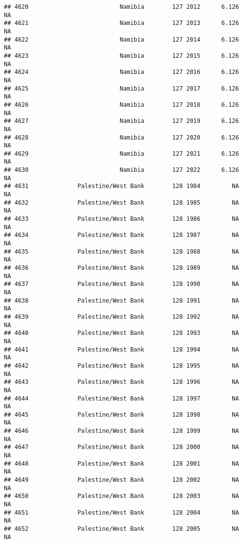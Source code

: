 \documentclass[
]{article}
\begin{document}
\begin{verbatim}
## 4620                          Namibia        127 2012      6.126         NA
## 4621                          Namibia        127 2013      6.126         NA
## 4622                          Namibia        127 2014      6.126         NA
## 4623                          Namibia        127 2015      6.126         NA
## 4624                          Namibia        127 2016      6.126         NA
## 4625                          Namibia        127 2017      6.126         NA
## 4626                          Namibia        127 2018      6.126         NA
## 4627                          Namibia        127 2019      6.126         NA
## 4628                          Namibia        127 2020      6.126         NA
## 4629                          Namibia        127 2021      6.126         NA
## 4630                          Namibia        127 2022      6.126         NA
## 4631              Palestine/West Bank        128 1984         NA         NA
## 4632              Palestine/West Bank        128 1985         NA         NA
## 4633              Palestine/West Bank        128 1986         NA         NA
## 4634              Palestine/West Bank        128 1987         NA         NA
## 4635              Palestine/West Bank        128 1988         NA         NA
## 4636              Palestine/West Bank        128 1989         NA         NA
## 4637              Palestine/West Bank        128 1990         NA         NA
## 4638              Palestine/West Bank        128 1991         NA         NA
## 4639              Palestine/West Bank        128 1992         NA         NA
## 4640              Palestine/West Bank        128 1993         NA         NA
## 4641              Palestine/West Bank        128 1994         NA         NA
## 4642              Palestine/West Bank        128 1995         NA         NA
## 4643              Palestine/West Bank        128 1996         NA         NA
## 4644              Palestine/West Bank        128 1997         NA         NA
## 4645              Palestine/West Bank        128 1998         NA         NA
## 4646              Palestine/West Bank        128 1999         NA         NA
## 4647              Palestine/West Bank        128 2000         NA         NA
## 4648              Palestine/West Bank        128 2001         NA         NA
## 4649              Palestine/West Bank        128 2002         NA         NA
## 4650              Palestine/West Bank        128 2003         NA         NA
## 4651              Palestine/West Bank        128 2004         NA         NA
## 4652              Palestine/West Bank        128 2005         NA         NA

\end{verbatim}
\end{document}
